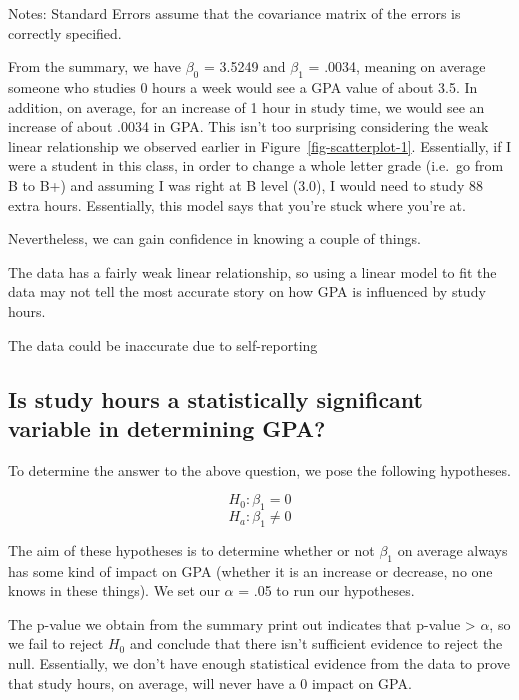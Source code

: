 \documentclass[
  letterpaper,
  DIV=11,
  numbers=noendperiod]{scrreprt}
\begin{document}
Notes: \newline
 [1] Standard Errors assume that the covariance matrix of the errors is correctly specified.

From the summary, we have \(\beta_0\) = 3.5249 and \(\beta_1\) = .0034,
meaning on average someone who studies 0 hours a week would see a GPA
value of about 3.5. In addition, on average, for an increase of 1 hour
in study time, we would see an increase of about .0034 in GPA. This
isn't too surprising considering the weak linear relationship we
observed earlier in Figure~\ref{fig-scatterplot-1}. Essentially, if I
were a student in this class, in order to change a whole letter grade
(i.e.~go from B to B+) and assuming I was right at B level (3.0), I
would need to study 88 extra hours. Essentially, this model says that
you're stuck where you're at.

Nevertheless, we can gain confidence in knowing a couple of things.

The data has a fairly weak linear relationship, so using a linear model
to fit the data may not tell the most accurate story on how GPA is
influenced by study hours.

The data could be inaccurate due to self-reporting

\hypertarget{is-study-hours-a-statistically-significant-variable-in-determining-gpa}{%
\subsection{Is study hours a statistically significant variable in
determining
GPA?}\label{is-study-hours-a-statistically-significant-variable-in-determining-gpa}}

To determine the answer to the above question, we pose the following
hypotheses.

\[
H_0: \beta_1 = 0
\] \[
H_a: \beta_1 \neq 0
\]

The aim of these hypotheses is to determine whether or not \(\beta_1\)
on average always has some kind of impact on GPA (whether it is an
increase or decrease, no one knows in these things). We set our
\(\alpha\) = .05 to run our hypotheses.

The p-value we obtain from the summary print out indicates that p-value
\textgreater{} \(\alpha\), so we fail to reject \(H_0\) and conclude
that there isn't sufficient evidence to reject the null. Essentially, we
don't have enough statistical evidence from the data to prove that study
hours, on average, will never have a 0 impact on GPA.
\end{document}
